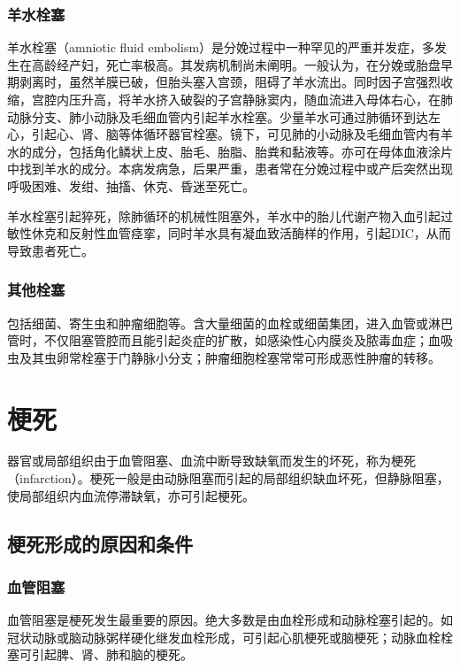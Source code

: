 \subsubsection{羊水栓塞}

羊水栓塞（amniotic fluid
embolism）是分娩过程中一种罕见的严重并发症，多发生在高龄经产妇，死亡率极高。其发病机制尚未阐明。一般认为，在分娩或胎盘早期剥离时，虽然羊膜已破，但胎头塞入宫颈，阻碍了羊水流出。同时因子宫强烈收缩，宫腔内压升高，将羊水挤入破裂的子宫静脉窦内，随血流进入母体右心，在肺动脉分支、肺小动脉及毛细血管内引起羊水栓塞。少量羊水可通过肺循环到达左心，引起心、肾、脑等体循环器官栓塞。镜下，可见肺的小动脉及毛细血管内有羊水的成分，包括角化鳞状上皮、胎毛、胎脂、胎粪和黏液等。亦可在母体血液涂片中找到羊水的成分。本病发病急，后果严重，患者常在分娩过程中或产后突然出现呼吸困难、发绀、抽搐、休克、昏迷至死亡。

羊水栓塞引起猝死，除肺循环的机械性阻塞外，羊水中的胎儿代谢产物入血引起过敏性休克和反射性血管痉挛，同时羊水具有凝血致活酶样的作用，引起DIC，从而导致患者死亡。

\subsubsection{其他栓塞}

包括细菌、寄生虫和肿瘤细胞等。含大量细菌的血栓或细菌集团，进入血管或淋巴管时，不仅阻塞管腔而且能引起炎症的扩散，如感染性心内膜炎及脓毒血症；血吸虫及其虫卵常栓塞于门静脉小分支；肿瘤细胞栓塞常常可形成恶性肿瘤的转移。

\section{梗死}

器官或局部组织由于血管阻塞、血流中断导致缺氧而发生的坏死，称为梗死（infarction）。梗死一般是由动脉阻塞而引起的局部组织缺血坏死，但静脉阻塞，使局部组织内血流停滞缺氧，亦可引起梗死。

\subsection{梗死形成的原因和条件}

\subsubsection{血管阻塞}

血管阻塞是梗死发生最重要的原因。绝大多数是由血栓形成和动脉栓塞引起的。如冠状动脉或脑动脉粥样硬化继发血栓形成，可引起心肌梗死或脑梗死；动脉血栓栓塞可引起脾、肾、肺和脑的梗死。

